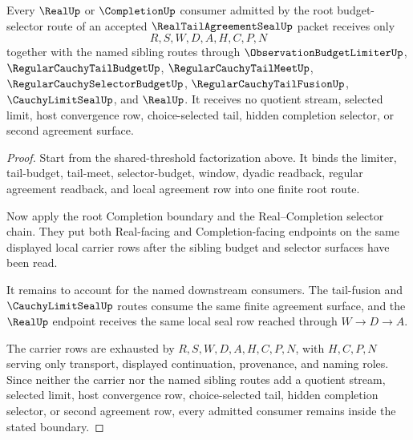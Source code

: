 \begin{theorem}
\label{thm:real-tail-agreement-seal-root-budget-completion-consumer-exhaustion}
Every $\RealUp$ or $\CompletionUp$ consumer admitted by the root budget-selector route of an accepted $\RealTailAgreementSealUp$ packet receives only
$$
R,S,W,D,A,H,C,P,N
$$
together with the named sibling routes through $\ObservationBudgetLimiterUp$, $\RegularCauchyTailBudgetUp$, $\RegularCauchyTailMeetUp$, $\RegularCauchySelectorBudgetUp$, $\RegularCauchyTailFusionUp$, $\CauchyLimitSealUp$, and $\RealUp$. It receives no quotient stream, selected limit, host convergence row, choice-selected tail, hidden completion selector, or second agreement surface.
\end{theorem}
\begin{proof}
Start from the shared-threshold factorization above. It binds the limiter, tail-budget, tail-meet, selector-budget, window, dyadic readback, regular agreement readback, and local agreement row into one finite root route.

Now apply the root Completion boundary and the Real--Completion selector chain. They put both Real-facing and Completion-facing endpoints on the same displayed local carrier rows after the sibling budget and selector surfaces have been read.

It remains to account for the named downstream consumers. The tail-fusion and $\CauchyLimitSealUp$ routes consume the same finite agreement surface, and the $\RealUp$ endpoint receives the same local seal row reached through $W \to D \to A$.

The carrier rows are exhausted by $R,S,W,D,A,H,C,P,N$, with $H,C,P,N$ serving only transport, displayed continuation, provenance, and naming roles. Since neither the carrier nor the named sibling routes add a quotient stream, selected limit, host convergence row, choice-selected tail, hidden completion selector, or second agreement row, every admitted consumer remains inside the stated boundary.
\end{proof}


